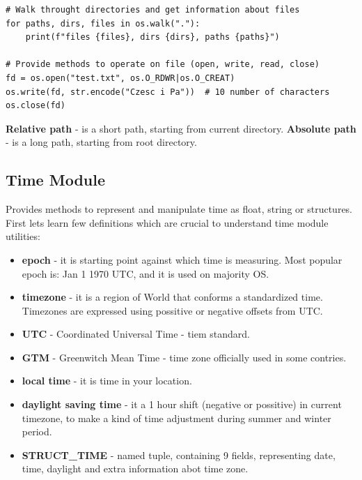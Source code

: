 \documentclass{article}
\begin{document}
\begin{lstlisting}[style=pystyle]
# Walk throught directories and get information about files
for paths, dirs, files in os.walk("."):
    print(f"files {files}, dirs {dirs}, paths {paths}")

# Provide methods to operate on file (open, write, read, close)
fd = os.open("test.txt", os.O_RDWR|os.O_CREAT)
os.write(fd, str.encode("Czesc i Pa"))	# 10 number of characters
os.close(fd)

\end{lstlisting}

\textbf{Relative path} - is a short path, starting from current directory. \textbf{Absolute path} - is a long path, starting from root directory.

\subsection{Time Module} \label{time:0}
Provides methods to represent and manipulate time as float, string or structures. First lets learn few definitions which are crucial to understand time module utilities:
\begin{itemize} \label{time:1}
\item \textbf{epoch} - it is starting point against which time is measuring. Most popular epoch is: Jan 1 1970 UTC, and it is used on majority OS.
\item \textbf{timezone} - it is a region of World that conforms a standardized time. Timezones are expressed using possitive or negative offsets from UTC.
\item \textbf{UTC} - Coordinated Universal Time - tiem standard.
\item \textbf{GTM} - Greenwitch Mean Time - time zone officially used in some contries.
\item \textbf{local time} - it is time in your location.
\item \textbf{daylight saving time} - it a 1 hour shift (negative or possitive) in current timezone, to make a kind of time adjustment during summer and winter period.
\item \textbf{STRUCT\_TIME} - named tuple, containing 9 fields, representing date, time, daylight and extra information abot time zone.
\end{itemize}
\end{document}
